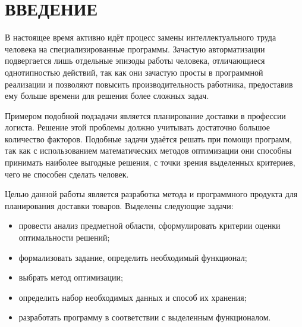 \section*{ВВЕДЕНИЕ}

В настоящее время активно идёт процесс замены интеллектуального труда человека на специализированные программы. Зачастую авторматизации подвергается лишь отдельные эпизоды работы человека, отличающиеся однотипностью действий, так как они зачастую просты в программной реализации и позволяют повысить производительность работника, предоставив ему больше времени для решения более сложных задач.

Примером подобной подзадачи является планирование доставки в профессии логиста. Решение этой проблемы должно учитывать достаточно большое количество факторов. Подобные задачи удаётся решать при помощи программ, так как с использованием математических методов оптимизации они способны принимать наиболее выгодные решения, с точки зрения выделенных критериев, чего не способен сделать человек.

Целью данной работы является разработка метода и программного продукта для планирования доставки товаров. 
Выделены следующие задачи:
\begin{itemize}
	\item провести анализ предметной области, сформулировать критерии оценки оптимальности решений;
	\item формализовать задание, определить необходимый функционал;
	\item выбрать метод оптимизации;
	\item определить набор необходимых данных и способ их хранения;
	\item разработать программу в соответствии с выделенным функционалом. 
	
\end{itemize}

\pagebreak